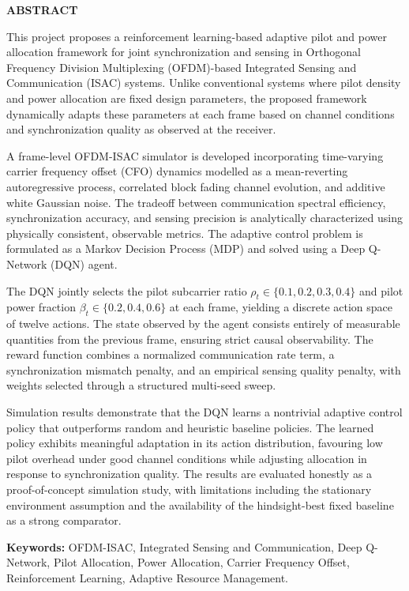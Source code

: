\begin{center}
{\Large{\bf{ABSTRACT}}}
\end{center}

This project proposes a reinforcement learning-based adaptive pilot and power allocation framework for joint synchronization and sensing in Orthogonal Frequency Division Multiplexing (OFDM)-based Integrated Sensing and Communication (ISAC) systems. Unlike conventional systems where pilot density and power allocation are fixed design parameters, the proposed framework dynamically adapts these parameters at each frame based on channel conditions and synchronization quality as observed at the receiver.

A frame-level OFDM-ISAC simulator is developed incorporating time-varying carrier frequency offset (CFO) dynamics modelled as a mean-reverting autoregressive process, correlated block fading channel evolution, and additive white Gaussian noise. The tradeoff between communication spectral efficiency, synchronization accuracy, and sensing precision is analytically characterized using physically consistent, observable metrics. The adaptive control problem is formulated as a Markov Decision Process (MDP) and solved using a Deep Q-Network (DQN) agent.

The DQN jointly selects the pilot subcarrier ratio $\rho_t \in \{0.1, 0.2, 0.3, 0.4\}$ and pilot power fraction $\beta_t \in \{0.2, 0.4, 0.6\}$ at each frame, yielding a discrete action space of twelve actions. The state observed by the agent consists entirely of measurable quantities from the previous frame, ensuring strict causal observability. The reward function combines a normalized communication rate term, a synchronization mismatch penalty, and an empirical sensing quality penalty, with weights selected through a structured multi-seed sweep.

Simulation results demonstrate that the DQN learns a nontrivial adaptive control policy that outperforms random and heuristic baseline policies. The learned policy exhibits meaningful adaptation in its action distribution, favouring low pilot overhead under good channel conditions while adjusting allocation in response to synchronization quality. The results are evaluated honestly as a proof-of-concept simulation study, with limitations including the stationary environment assumption and the availability of the hindsight-best fixed baseline as a strong comparator.

\vspace{3mm}
\noindent\textbf{Keywords:} OFDM-ISAC, Integrated Sensing and Communication, Deep Q-Network, Pilot Allocation, Power Allocation, Carrier Frequency Offset, Reinforcement Learning, Adaptive Resource Management.

\clearpage
